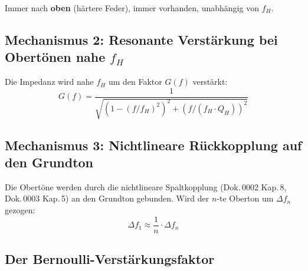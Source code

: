 \documentclass[11pt,a4paper]{article}
\begin{document}
Immer nach \textbf{oben} (härtere Feder), immer vorhanden, unabhängig von $f_H$.

\subsection{Mechanismus 2: Resonante Verstärkung bei Obertönen nahe $f_H$}

Die Impedanz wird nahe $f_H$ um den Faktor $G(f)$ verstärkt:
\begin{equation}
G(f) = \frac{1}{\sqrt{\left(1 - (f/f_H)^2\right)^2 + \left(f/(f_H \cdot Q_H)\right)^2}}
\end{equation}

\begin{table}[H]
\centering\small
{}
\caption{Impedanz-Verstärkung $G(f)$ des Helmholtz-Resonators bei den Obertönen der 50-Hz-Zunge ($f_H = 274$\,Hz, $Q_H = 7$). Phasenwerte aus Dok.\,0002 Kap.\,11.}
\end{table}

\subsection{Mechanismus 3: Nichtlineare Rückkopplung auf den Grundton}

Die Obertöne werden durch die nichtlineare Spaltkopplung (Dok.\,0002 Kap.\,8, Dok.\,0003 Kap.\,5) an den Grundton gebunden. Wird der $n$-te Oberton um $\Delta f_n$ gezogen:
\begin{equation}
\Delta f_1 \approx \frac{1}{n} \cdot \Delta f_n
\end{equation}

\subsection{Der Bernoulli-Verstärkungsfaktor}
\end{document}
